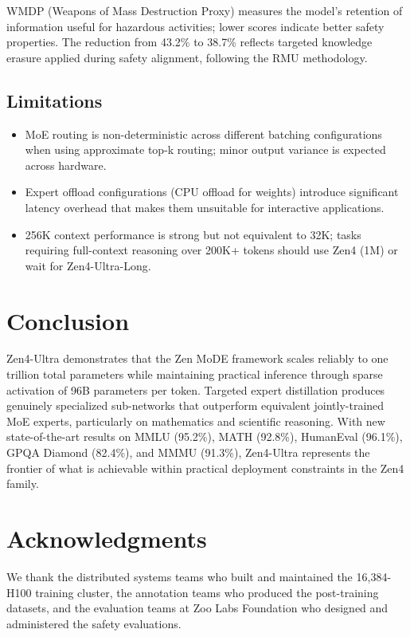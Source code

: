 \documentclass[11pt,a4paper]{article}
\begin{document}
WMDP (Weapons of Mass Destruction Proxy) measures the model's retention of information
useful for hazardous activities; lower scores indicate better safety properties. The
reduction from 43.2\% to 38.7\% reflects targeted knowledge erasure applied during
safety alignment, following the RMU methodology.

\subsection{Limitations}

\begin{itemize}
    \item MoE routing is non-deterministic across different batching configurations
    when using approximate top-k routing; minor output variance is expected across hardware.
    \item Expert offload configurations (CPU offload for weights) introduce significant
    latency overhead that makes them unsuitable for interactive applications.
    \item 256K context performance is strong but not equivalent to 32K; tasks requiring
    full-context reasoning over 200K+ tokens should use Zen4 (1M) or wait for Zen4-Ultra-Long.
\end{itemize}

\section{Conclusion}

Zen4-Ultra demonstrates that the Zen MoDE framework scales reliably to one trillion total
parameters while maintaining practical inference through sparse activation of 96B parameters
per token. Targeted expert distillation produces genuinely specialized sub-networks that
outperform equivalent jointly-trained MoE experts, particularly on mathematics and scientific
reasoning. With new state-of-the-art results on MMLU (95.2\%), MATH (92.8\%), HumanEval
(96.1\%), GPQA Diamond (82.4\%), and MMMU (91.3\%), Zen4-Ultra represents the frontier
of what is achievable within practical deployment constraints in the Zen4 family.

\section*{Acknowledgments}

We thank the distributed systems teams who built and maintained the 16,384-H100 training
cluster, the annotation teams who produced the post-training datasets, and the evaluation
teams at Zoo Labs Foundation who designed and administered the safety evaluations.
\end{document}
